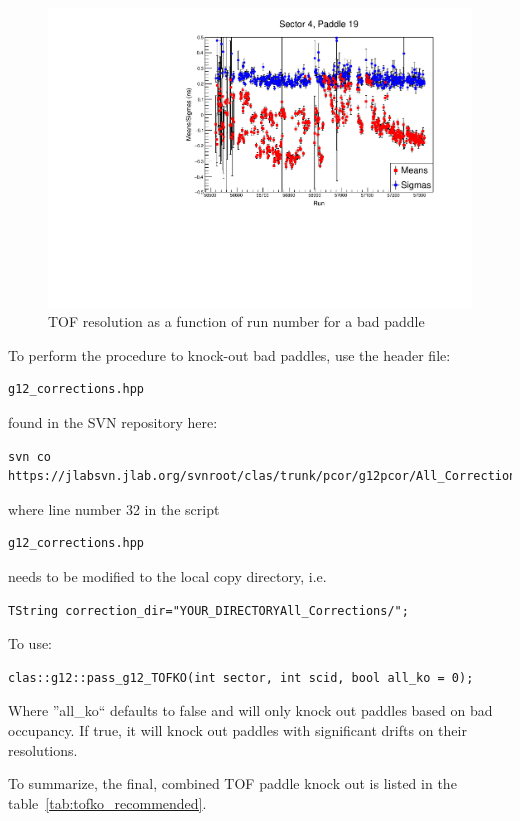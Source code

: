 \begin{figure}\begin{center}
      \includegraphics[width=0.4\columnwidth,angle=270]{figures/calib/tof/badexample.pdf}
   \caption{\label{plot:example.badpaddle}TOF resolution as a function of run number for a bad paddle}
\end{center}\end{figure}

To perform the procedure to knock-out bad  paddles, use the header file:
\begin{verbatim}
g12_corrections.hpp
\end{verbatim}
found in the SVN repository here:
\begin{verbatim}
svn co https://jlabsvn.jlab.org/svnroot/clas/trunk/pcor/g12pcor/All_Corrections
\end{verbatim}
where line number 32 in the script 
\begin{verbatim}
g12_corrections.hpp
\end{verbatim}
needs to be modified to the local copy directory, i.e.
\begin{verbatim}
TString correction_dir="YOUR_DIRECTORYAll_Corrections/";
\end{verbatim}
To use:
\begin{verbatim}
clas::g12::pass_g12_TOFKO(int sector, int scid, bool all_ko = 0);
\end{verbatim}
Where ''all\_ko`` defaults to false and will only knock out paddles based on bad occupancy. If true, it will knock out paddles with significant drifts on their resolutions.



To summarize, the final, combined TOF paddle knock out is listed in the table~\ref{tab:tofko_recommended}.

